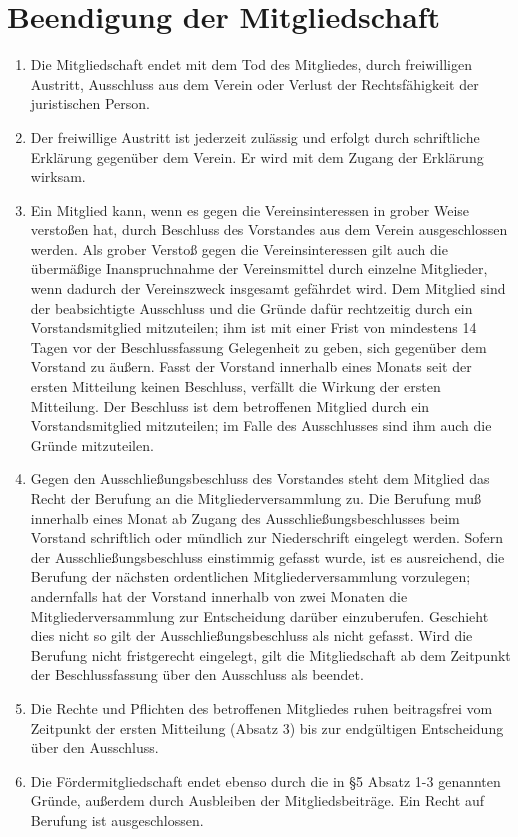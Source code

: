 \documentclass[ngerman]{scrartcl}
\begin{document}
\section{Beendigung der Mitgliedschaft} \label{sec:beendigung_der_mitgliedschaft}
\begin{enumerate}
 \item Die Mitgliedschaft endet mit dem Tod des Mitgliedes, durch
 freiwilligen Austritt, Ausschluss aus dem Verein oder Verlust
 der Rechtsfähigkeit der juristischen Person.
 \item Der freiwillige Austritt ist jederzeit zulässig und
 erfolgt durch schriftliche Erklärung gegenüber dem Verein. Er
 wird mit dem Zugang der Erklärung wirksam.
 \item Ein Mitglied kann, wenn es gegen die Vereinsinteressen in
 grober Weise verstoßen hat, durch Beschluss des Vorstandes aus
 dem Verein ausgeschlossen werden. Als grober Verstoß gegen
 die Vereinsinteressen gilt auch die übermäßige
 Inanspruchnahme der Vereinsmittel durch einzelne Mitglieder,
 wenn dadurch der Vereinszweck insgesamt gefährdet wird. Dem
 Mitglied sind der beabsichtigte Ausschluss und die Gründe
 dafür rechtzeitig durch ein Vorstandsmitglied mitzuteilen;
 ihm ist mit einer Frist von mindestens 14 Tagen vor der
 Beschlussfassung Gelegenheit zu geben, sich gegenüber dem
 Vorstand zu äußern. Fasst der Vorstand innerhalb eines Monats
 seit der ersten Mitteilung keinen Beschluss, verfällt die
 Wirkung der ersten Mitteilung. Der Beschluss ist dem
 betroffenen Mitglied durch ein Vorstandsmitglied 
 mitzuteilen; im Falle des Ausschlusses sind ihm auch die
 Gründe mitzuteilen.
 \item Gegen den Ausschließungsbeschluss des Vorstandes steht dem
 Mitglied das Recht der Berufung an die Mitgliederversammlung
 zu. Die Berufung muß innerhalb eines Monat ab Zugang des
 Ausschließungsbeschlusses beim Vorstand schriftlich oder
 mündlich zur Niederschrift eingelegt werden. Sofern der
 Ausschließungsbeschluss einstimmig gefasst wurde, ist es
 ausreichend, die Berufung der nächsten ordentlichen
 Mitgliederversammlung vorzulegen; andernfalls hat der
 Vorstand innerhalb von zwei Monaten die Mitgliederversammlung
 zur Entscheidung darüber einzuberufen. Geschieht dies nicht
 so gilt der Ausschließungsbeschluss als nicht gefasst. Wird die
 Berufung nicht fristgerecht eingelegt, gilt die
 Mitgliedschaft ab dem Zeitpunkt der Beschlussfassung über den
 Ausschluss als beendet.
 \item Die Rechte und Pflichten des betroffenen Mitgliedes ruhen
 beitragsfrei vom Zeitpunkt der ersten Mitteilung (Absatz 3)
 bis zur endgültigen Entscheidung über den Ausschluss.
 \item Die Fördermitgliedschaft endet ebenso durch die in §5
 Absatz 1-3 genannten Gründe, außerdem durch Ausbleiben der
 Mitgliedsbeiträge. Ein Recht auf Berufung ist ausgeschlossen.
\end{enumerate}
\end{document}
